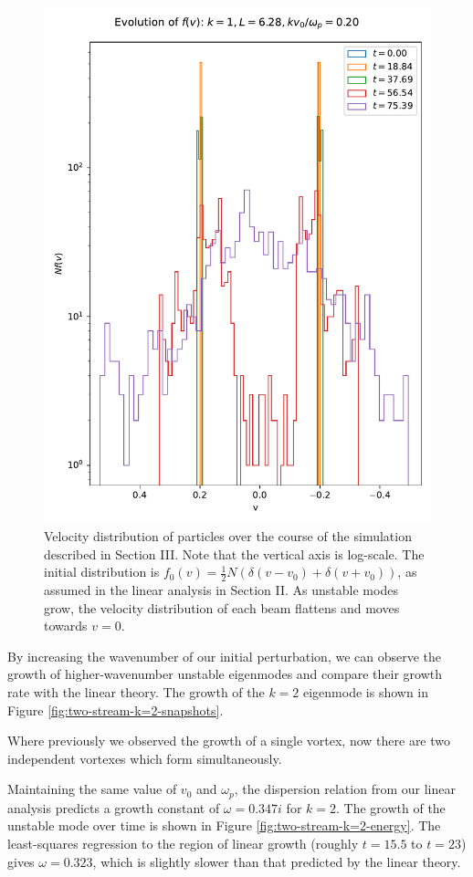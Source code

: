 \documentclass[%
 reprint,
 amsmath,amssymb,
 aps,
]{revtex4-2}
\begin{document}
\begin{figure}
\includegraphics[width=0.8\linewidth]{proj3/fv_hist_1024_particles.pdf}
\caption{\label{fig:fv-evolution-two-stream}Velocity distribution of particles over the course of the simulation described in Section III. Note that the vertical axis is log-scale. The initial distribution is $f_0 (v) = \frac{1}{2}N \left( \delta(v - v_0) + \delta(v + v_0) \right)$, as assumed in the linear analysis in Section II. As unstable modes grow, the velocity distribution of each beam flattens and moves towards $v=0$.}
\end{figure}

By increasing the wavenumber of our initial perturbation, we can observe the growth of higher-wavenumber unstable eigenmodes and compare their growth rate with the linear theory. The growth of the $k=2$ eigenmode is shown in Figure \ref{fig:two-stream-k=2-snapshots}.

Where previously we observed the growth of a single vortex, now there are two independent vortexes which form simultaneously.

Maintaining the same value of $v_0$ and $\omega_p$, the dispersion relation from our linear analysis predicts a growth constant of $\omega = 0.347i$ for $k=2$. The growth of the unstable mode over time is shown in Figure \ref{fig:two-stream-k=2-energy}. The least-squares regression to the region of linear growth (roughly $t=15.5$ to $t=23$) gives $\omega = 0.323$, which is slightly slower than that predicted by the linear theory.
\end{document}

